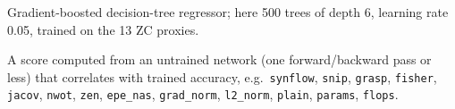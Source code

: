 \documentclass[pdflatex,sn-mathphys-num]{sn-jnl}
\newcommand{\code}[1]{\texttt{#1}}
\begin{document}
\begin{appendices}
\begin{description}[style=nextline,leftmargin=0pt,itemsep=3pt]
\item[XGBoost.] Gradient-boosted decision-tree regressor; here 500 trees of depth 6, learning rate 0.05, trained on the 13 ZC proxies.

\item[Zero-cost (ZC) proxy.] A score computed from an untrained network (one forward/backward pass or less) that correlates with trained accuracy, e.g.\ \code{synflow}, \code{snip}, \code{grasp}, \code{fisher}, \code{jacov}, \code{nwot}, \code{zen}, \code{epe\_nas}, \code{grad\_norm}, \code{l2\_norm}, \code{plain}, \code{params}, \code{flops}.
\end{description}
\end{appendices}


\end{document}
